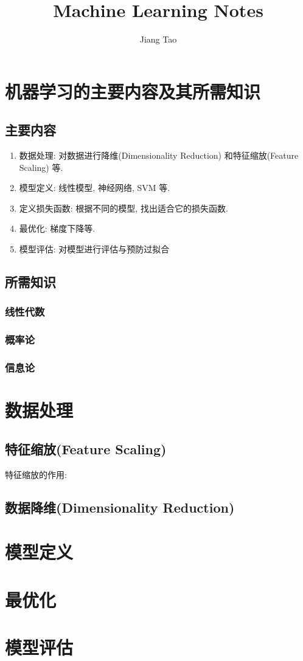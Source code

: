 \documentclass[oneside]{book}
\title{\titlteFont Machine Learning Notes}
\author{\authorFont Jiang Tao}
\date{}
\begin{document}
	\begin{titlepage}
		\maketitle
	\end{titlepage}
	\tableofcontents
	\chapter*{机器学习的主要内容及其所需知识}
	 	\section{主要内容}
			\begin{enumerate} 
				\item 数据处理: 对数据进行降维(Dimensionality Reduction) 和特征缩放(Feature Scaling) 等.
				\item 模型定义: 线性模型, 神经网络, SVM 等.
				\item 定义损失函数: 根据不同的模型, 找出适合它的损失函数.
				\item 最优化: 梯度下降等.
				\item 模型评估: 对模型进行评估与预防过拟合
			\end{enumerate}
		\section{所需知识}
			\subsection{线性代数}
			\subsection{概率论}
			\subsection{信息论}
	\chapter{数据处理}
		\section{特征缩放(Feature Scaling)}
			特征缩放的作用: 
		\section{数据降维(Dimensionality Reduction)}
		
	\chapter{模型定义}
	\chapter{最优化}
	\chapter{模型评估}
\end{document}
